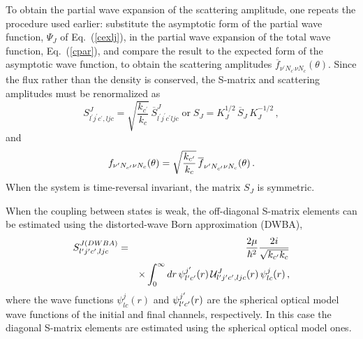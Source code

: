To obtain the partial wave expansion of the scattering amplitude, one
repeats the procedure used earlier: substitute the asymptotic form of the
partial wave function, $\Psi_{J}$ of Eq.~(\ref{cexlj}), in the partial wave
expansion of the total wave function, Eq.~(\ref{cpar}), and compare the
result to the expected form of the asymptotic wave function, to obtain the
scattering amplitudes $\overline{f}_{\nu^{\prime}N_{c^{\prime}}\nu
N_{c}}(\theta) $. Since the flux rather than the density is conserved, the
S-matrix and scattering amplitudes must be renormalized as
\begin{equation}
S_{l^{\prime}j^{\prime}c^{\prime},ljc}^{J}=\sqrt{\frac{k_{c^{\prime}}}{k_{c}}%
}\,\overline{S}_{l^{\prime}j^{\prime}c^{\prime}ljc}^{J}\;\text{or}\;
S_{J}=K_{J}^{1/2}\,\overline{S}_{J}\, K_{J}^{-1/2}\,,
\end{equation}
and
\begin{equation}
f_{\nu^{\prime}N_{c^{\prime}}\nu N_{c}}(\theta)=\sqrt{\frac{k_{c^{\prime}}}{%
k_{c}}}\,\overline{f}_{\nu^{\prime}N_{c^{\prime}}\nu N_{c}}(\theta)\,.
\end{equation}
When the system is time-reversal invariant, the matrix $S_{J}$ is symmetric.

When the coupling between states is weak, the off-diagonal S-matrix elements
can be estimated using the distorted-wave Born approximation (DWBA),
\begin{eqnarray}
S_{l^{\prime}j^{\prime}c^{\prime},ljc}^{J(DWBA)} & = & \frac{2\mu}{\hbar^2}%
\frac{2i}{\sqrt{k_{c^{\prime}}k_c}} \\
& & \times \int_0^{\infty}dr\, \psi_{l^{\prime}c^{\prime}}^{j^{\prime}}(r)\,{%
\mathcal{U}}_{l^{\prime}j^{\prime}c^{\prime},ljc}^{J}(r)\,\psi_{lc}^{j}(r)\,,
\notag
\end{eqnarray}
where the wave functions $\psi_{lc}^{j}(r)$ and $\psi_{l^{\prime}c^{%
\prime}}^{j^{\prime}}(r)$ are the spherical optical model wave functions of
the initial and final channels, respectively. In this case the diagonal
S-matrix elements are estimated using the spherical optical model ones.

